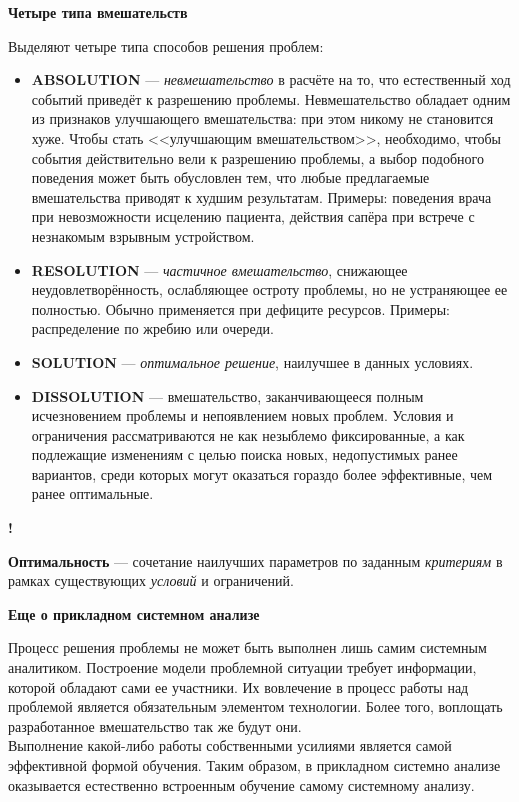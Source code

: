 \documentclass{article}
\newcommand{\note}[1]{\textit{#1}}
\newcommand{\important}[1]{\textbf{#1}}
\renewcommand{\subsection}[1]{
	\vspace{2em}
	\begin{flushright}
		\large
		\textbf{#1}
	\end{flushright}
	}
\newcommand{\define}[2]{
	\textbf{#1} --- #2
	}
\newcommand{\definewithmark}[2]{
	\begin{flushright}\textbf{!}\hspace{2ex}\vline\hspace{2ex}
		\begin{minipage}{0.9\textwidth}
			\define{#1}{#2}
		\end{minipage}
	\end{flushright}
	}
\begin{document}
\subsection{Четыре типа вмешательств}
Выделяют четыре типа способов решения проблем:
\begin{itemize}
	\item \important{ABSOLUTION} --- \note{невмешательство} в расчёте на то, что естественный ход событий приведёт к разрешению проблемы. Невмешательство обладает одним из признаков улучшающего вмешательства: при этом никому не становится хуже. Чтобы стать <<улучшающим вмешательством>>, необходимо, чтобы события действительно вели к разрешению проблемы, а выбор подобного поведения может быть обусловлен тем, что любые предлагаемые вмешательства приводят к худшим результатам. Примеры: поведения врача при невозможности исцелению пациента, действия сапёра при встрече с незнакомым взрывным устройством.
	\item \important{RESOLUTION} --- \note{частичное вмешательство}, снижающее неудовлетворённость, ослабляющее остроту проблемы, но не устраняющее ее полностью. Обычно применяется при дефиците ресурсов. Примеры: распределение по жребию или очереди.
	\item \important{SOLUTION} --- \note{оптимальное решение}, наилучшее в данных условиях. 
	\item \important{DISSOLUTION} --- вмешательство, заканчивающееся полным исчезновением проблемы и непоявлением новых проблем. Условия и ограничения рассматриваются не как незыблемо фиксированные, а как подлежащие изменениям с целью поиска новых, недопустимых ранее вариантов, среди которых могут оказаться гораздо более эффективные, чем ранее оптимальные.	
\end{itemize}
\definewithmark{Оптимальность}{сочетание наилучших параметров по заданным \note{критериям} в рамках существующих \note{условий} и ограничений.}
\subsection{Еще о прикладном системном анализе}
Процесс решения проблемы не может быть выполнен лишь самим системным аналитиком. Построение модели проблемной ситуации требует информации, которой обладают сами ее участники. Их вовлечение в процесс работы над проблемой является обязательным элементом технологии. Более того, воплощать разработанное вмешательство так же будут они.\\
Выполнение какой-либо работы собственными усилиями является самой эффективной формой обучения. Таким образом, в прикладном системно анализе оказывается естественно встроенным обучение самому системному анализу.
\end{document}
